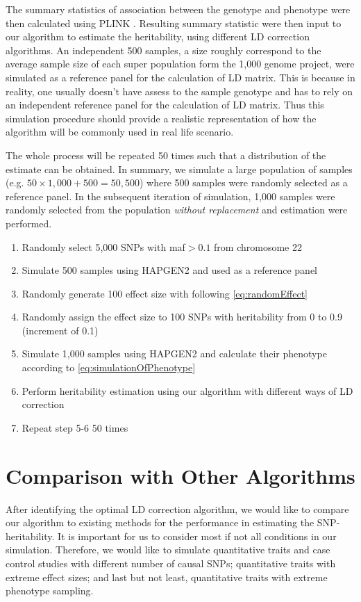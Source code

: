 		The summary statistics of association between the genotype and phenotype were then calculated using PLINK \citep{Purcell2007}.
		Resulting summary statistic were then input to our algorithm to estimate the heritability, using different \gls{LD} correction algorithms.
		An independent 500 samples, a size roughly correspond to the average sample size of each super population form the 1,000 genome project,  were simulated as a reference panel for the calculation of \gls{LD} matrix.
		This is because in reality, one usually doesn't have assess to the sample genotype and has to rely on an independent reference panel for the calculation of \gls{LD} matrix. 
		Thus this simulation procedure should provide a realistic representation of how the algorithm will be commonly used in real life scenario.
		
		The whole process will be repeated 50 times such that a distribution of the estimate can be obtained. 
		In summary, we simulate a large population of samples (e.g. $50\times1,000+500 = 50,500$) where 500 samples were randomly selected as a reference panel. 
		In the subsequent iteration of simulation, 1,000 samples were randomly selected from the population \textit{without replacement} and estimation were performed.
		\begin{enumerate}
			\item Randomly select 5,000 \glspl{SNP} with \gls{maf}$>0.1$ from chromosome 22
			\item Simulate 500 samples using HAPGEN2 and used as a reference panel
			\item Randomly generate 100 effect size with following \cref{eq:randomEffect}
			\item Randomly assign the effect size to 100 \glspl{SNP} with heritability from 0 to 0.9 (increment of 0.1)
			\item Simulate 1,000 samples using HAPGEN2 and calculate their phenotype according to \cref{eq:simulationOfPhenotype} 
			\item Perform heritability estimation using our algorithm with different ways of \gls{LD} correction
			\item Repeat step 5-6 50 times
		\end{enumerate}
		
		\section{Comparison with Other Algorithms}
		After identifying the optimal \gls{LD} correction algorithm, we would like to compare our algorithm to existing methods for the performance in estimating the \gls{SNP}-heritability.
		It is important for us to consider most if not all conditions in our simulation. 
		Therefore, we would like to simulate quantitative traits and case control studies with different number of causal \glspl{SNP}; quantitative traits with extreme effect sizes; and last but not least, quantitative traits with extreme phenotype sampling.
		
